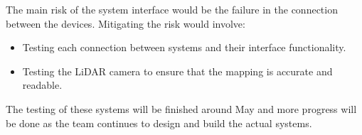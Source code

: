 \documentclass[a4paper, 10pt]{article}
\begin{document}
The main risk of the system interface would be the failure in the connection between the devices. Mitigating the risk would involve:

\begin{itemize}
\item
Testing each connection between systems and their interface functionality.

\item
Testing the LiDAR camera to ensure that the mapping is accurate and readable. 
\end{itemize}

The testing of these systems will be finished around May and more progress will be done as the team continues to design and build the actual systems.

	
\end{document}
